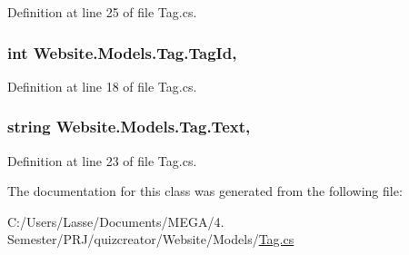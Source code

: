 Definition at line 25 of file Tag.\+cs.

\hypertarget{class_website_1_1_models_1_1_tag_ae9c7e4358c988e6f72ed69489987d180}{}
\subsubsection[{Tag\+Id}]{\setlength{\rightskip}{0pt plus 5cm}int Website.\+Models.\+Tag.\+Tag\+Id\hspace{0.3cm}{\ttfamily [get]}, {\ttfamily [set]}}\label{class_website_1_1_models_1_1_tag_ae9c7e4358c988e6f72ed69489987d180}


Definition at line 18 of file Tag.\+cs.

\hypertarget{class_website_1_1_models_1_1_tag_a0ec1a5085cd4b2c99c9c421bcf2f0b17}{}
\subsubsection[{Text}]{\setlength{\rightskip}{0pt plus 5cm}string Website.\+Models.\+Tag.\+Text\hspace{0.3cm}{\ttfamily [get]}, {\ttfamily [set]}}\label{class_website_1_1_models_1_1_tag_a0ec1a5085cd4b2c99c9c421bcf2f0b17}


Definition at line 23 of file Tag.\+cs.



The documentation for this class was generated from the following file\+:\begin{DoxyCompactItemize}
\item 
C\+:/\+Users/\+Lasse/\+Documents/\+M\+E\+G\+A/4. Semester/\+P\+R\+J/quizcreator/\+Website/\+Models/\hyperlink{_tag_8cs}{Tag.\+cs}\end{DoxyCompactItemize}
